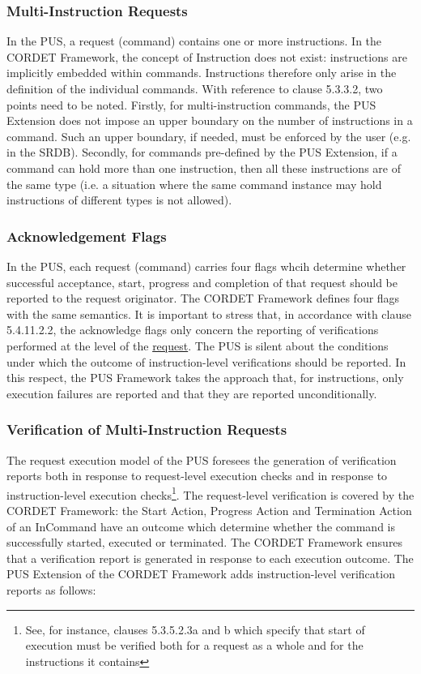 \documentclass{pnp_article}
\begin{document}
\subsubsection{Multi-Instruction Requests}
In the PUS, a request (command) contains one or more instructions. In the CORDET Framework, the concept of Instruction does not exist: instructions are implicitly embedded within commands. Instructions therefore only arise in the definition of the individual commands. With reference to clause 5.3.3.2, two points need to be noted. Firstly, for multi-instruction commands, the PUS Extension does not impose an upper boundary on the number of instructions in a command. Such an upper boundary, if needed, must be enforced by the user (e.g. in the SRDB). Secondly, for commands pre-defined by the PUS Extension, if a command can hold more than one instruction, then all these instructions are of the same type (i.e. a situation where the same command instance may hold instructions of different types is not allowed). 

\subsubsection{Acknowledgement Flags} In the PUS, each request (command) carries four flags whcih determine whether successful acceptance, start, progress and completion of that request should be reported to the request originator. The CORDET Framework defines four flags with the same semantics. It is important to stress that, in accordance with clause 5.4.11.2.2, the acknowledge flags only concern the reporting of verifications performed at the level of the \underline{request}. The PUS is silent about the conditions under which the outcome of instruction-level verifications should be reported. In this respect, the PUS Framework takes the  approach that, for instructions, only execution failures are reported and that they are reported unconditionally. 


\subsubsection{Verification of Multi-Instruction Requests}
The request execution model of the PUS foresees the generation of verification reports both in response to request-level execution checks and in response to instruction-level execution checks\footnote{See, for instance, clauses 5.3.5.2.3a and b which specify that start of execution must be verified both for a request as a whole and for the instructions it contains}. The request-level verification is covered by the CORDET Framework: the Start Action, Progress Action and Termination Action of an InCommand have an outcome which determine whether the command is successfully started, executed or terminated. The CORDET Framework ensures that a verification report is generated in response to each execution outcome. The PUS Extension of the CORDET Framework adds instruction-level verification reports as follows:
\end{document}
